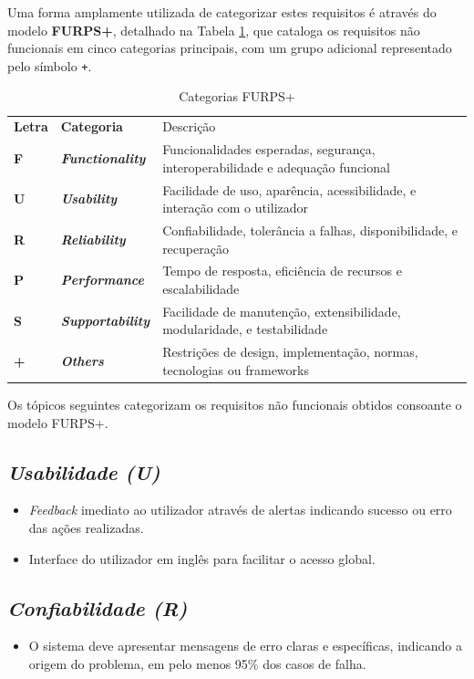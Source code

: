 Uma forma amplamente utilizada de categorizar estes requisitos é através do modelo \textbf{FURPS+}, detalhado na Tabela \ref{tab:furps}, que cataloga os requisitos não funcionais em cinco categorias principais, com um grupo adicional representado pelo símbolo \texttt{+}.

\begin{table}[H]
    \renewcommand{\arraystretch}{1.2}
    \setlength{\tabcolsep}{10pt}
    \centering
    \begin{tabular}{>{\bfseries}p{1cm} >{\bfseries}p{2.5cm} p{10cm}}
        \rowcolor{blue!50}
        Letra & Categoria & Descrição \\
        F & \textit{Functionality} & Funcionalidades esperadas, segurança, interoperabilidade e adequação funcional \\
        U & \textit{Usability} & Facilidade de uso, aparência, acessibilidade, e interação com o utilizador \\
        R & \textit{Reliability} & Confiabilidade, tolerância a falhas, disponibilidade, e recuperação \\
        P & \textit{Performance} & Tempo de resposta, eficiência de recursos e escalabilidade \\
        S & \textit{Supportability} & Facilidade de manutenção, extensibilidade, modularidade, e testabilidade \\
        + & \textit{Others} & Restrições de design, implementação, normas, tecnologias ou frameworks \\
    \end{tabular}
    \caption{Categorias FURPS+}
    \label{tab:furps}
\end{table}

Os tópicos seguintes categorizam os requisitos não funcionais obtidos consoante o modelo FURPS+.

\subsection{\textit{Usabilidade (U)}}
\begin{itemize}
    \item \textit{Feedback} imediato ao utilizador através de alertas indicando sucesso ou erro das ações realizadas.
    \item Interface do utilizador em inglês para facilitar o acesso global.
\end{itemize}

\subsection{\textit{Confiabilidade (R)}}
\begin{itemize}
    \item O sistema deve apresentar mensagens de erro claras e específicas, indicando a origem do problema, em pelo menos 95\% dos casos de falha.
\end{itemize}

